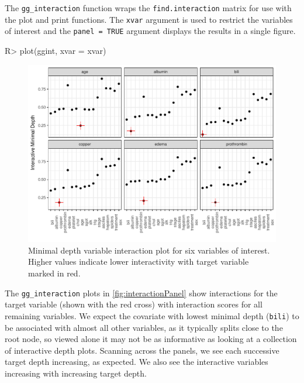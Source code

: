 \documentclass[article]{jss}
\begin{document}
The \texttt{gg\_interaction} function wraps the
\texttt{find.interaction} matrix for use with the 
plot and print functions. The \texttt{xvar} argument is used to restrict
the variables of interest and the \texttt{panel\ =\ TRUE} argument
displays the results in a single figure.

\begin{Schunk}
\begin{Sinput}
R> plot(ggint, xvar = xvar)
\end{Sinput}
\begin{figure}[!htb]

{\centering \includegraphics{rfs-interactionPanel-1} 

}

\caption[Minimal depth variable interaction plot for six variables of interest]{Minimal depth variable interaction plot for six variables of interest. Higher values indicate lower interactivity with target variable marked in red.}\label{fig:interactionPanel}
\end{figure}
\end{Schunk}

The \texttt{gg\_interaction} plots in \autoref{fig:interactionPanel}
show interactions for the target variable (shown with the red cross)
with interaction scores for all remaining variables. We expect the
covariate with lowest minimal depth (\texttt{bili}) to be associated
with almost all other variables, as it typically splits close to the
root node, so viewed alone it may not be as informative as looking at a
collection of interactive depth plots. Scanning across the panels, we
see each successive target depth increasing, as expected. We also see
the interactive variables increasing with increasing target depth.
\end{document}
